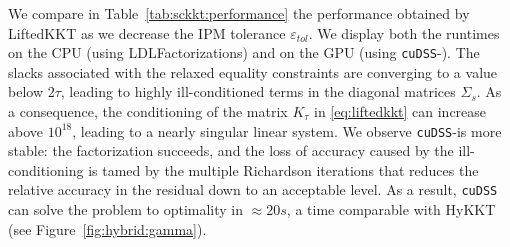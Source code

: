 We compare in Table~\ref{tab:sckkt:performance} the performance obtained by LiftedKKT
as we decrease the IPM tolerance $\varepsilon_{tol}$.
We display both the runtimes on the CPU (using LDLFactorizations) and on the GPU (using {\tt cuDSS}-\ldlt).
The slacks associated with the relaxed equality constraints are converging to a value below $2 \tau$,
leading to highly ill-conditioned terms in the diagonal matrices $\Sigma_s$.
As a consequence, the conditioning of the matrix $K_\tau$ in \eqref{eq:liftedkkt} can increase
above $10^{18}$, leading to a nearly singular linear system.
We observe {\tt cuDSS}-\ldlt is more stable: the factorization
succeeds, and the loss of accuracy caused by the ill-conditioning is tamed by the multiple
Richardson iterations that reduces the relative accuracy in the residual down to an acceptable level.
As a result, {\tt cuDSS} can solve
the problem to optimality in $\approx 20s$, a time comparable with HyKKT (see Figure~\ref{fig:hybrid:gamma}).

\begin{table}[!ht]
  \centering
  \label{tab:sckkt:performance}
  \caption{Performance of the equality-relaxation
    strategy as we decrease the IPM tolerance $\varepsilon_{tol}$.
    The table displays the wall time on the CPU (using LDLFactorizations)
    and on the GPU (using cuDSS-\ldlt).
  }
\end{table}

